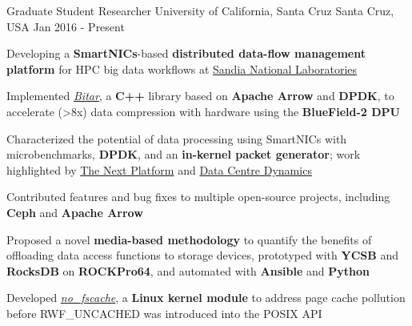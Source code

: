 

\begin{cventries}

  \cventry
    {Graduate Student Researcher} %
    {University of California, Santa Cruz} %
    {Santa Cruz, USA} %
    {Jan 2016 - Present} %
    {
      \begin{cvitems} %
        \item {Developing a \textbf{SmartNICs}-based \textbf{distributed data-flow management platform} for HPC big data workflows at \href{https://www.sandia.gov/}{Sandia National Laboratories}}
        \item {Implemented \href{https://github.com/ljishen/bitar}{\textit{Bitar}}, a \textbf{C++} library based on \textbf{Apache Arrow} and \textbf{DPDK}, to accelerate (\textgreater 8x) data compression with hardware using the \textbf{BlueField-2 DPU}}
        \item {Characterized the potential of data processing using SmartNICs with microbenchmarks, \textbf{DPDK}, and an \textbf{in-kernel packet generator}; work highlighted by \href{https://www.nextplatform.com/2021/05/24/testing-the-limits-of-the-bluefield-2-smartnic/}{The Next Platform} and \href{https://www.datacenterdynamics.com/en/news/intel-pitches-infrastructure-processing-unit-as-new-data-center-dpu/}{Data Centre Dynamics}}
        \item {Contributed features and bug fixes to multiple open-source projects, including \textbf{Ceph} and \textbf{Apache Arrow}}
        \item {Proposed a novel \textbf{media-based methodology} to quantify the benefits of offloading data access functions to storage devices, prototyped with \textbf{YCSB} and \textbf{RocksDB} on \textbf{ROCKPro64}, and automated with \textbf{Ansible} and \textbf{Python}}
        \item {Developed \href{https://github.com/ljishen/nofscache}{\textit{no\_fscache}}, a \textbf{Linux kernel module} to address page cache pollution before RWF\_UNCACHED was introduced into the POSIX API}
      \end{cvitems}
    }


\end{cventries}
